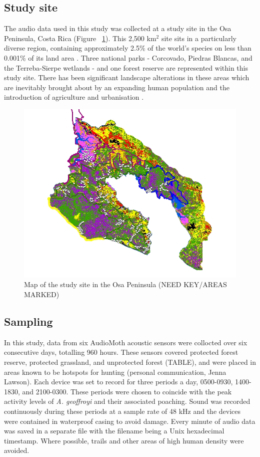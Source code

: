 \subsection{Study site}

The audio data used in this study was collected at a study site in the Osa Peninsula, Costa Rica (Figure ~\ref{fig:peninsula_map}). This 2,500 km$^2$ site sits in a particularly diverse region, containing approximately 2.5\% of the world's species on less than 0.001\% of its land area \citep{Lawson2019}. Three national parks - Corcovado, Piedras Blancas, and the Terreba-Sierpe wetlands - and one forest reserve are represented within this study site. There has been significant landscape alterations in these areas which are inevitably brought about by an expanding human population and the introduction of agriculture and urbanisation \citep{Hobinger2012}.

\begin{figure}
\includegraphics[width=1.2\textwidth,center]{Figures/peninsula_map}\caption[Map of Osa Peninsula]{Map of the study site in the Osa Peninsula \cite{Lawson2019} (NEED KEY/AREAS MARKED)}\label{fig:peninsula_map}
\end{figure}

\subsection{Sampling}

In this study, data from six AudioMoth acoustic sensors were collocted over six consecutive days, totalling 960 hours. These sensors covered protected forest reserve, protected grassland, and unprotected forest (TABLE), and were placed in areas known to be hotspots for hunting (personal communication, Jenna Lawson). Each device was set to record for three periods a day, 0500-0930, 1400-1830, and 2100-0300. These periods were chosen to coincide with the peak activity levels of \textit{A. geoffroyi} and their associated poaching. Sound was recorded continuously during these periods at a sample rate of 48 kHz and the devices were contained in waterproof casing to avoid damage. Every minute of audio data was saved in a separate file with the filename being a Unix hexadecimal timestamp. Where possible, trails and other areas of high human density were avoided.


